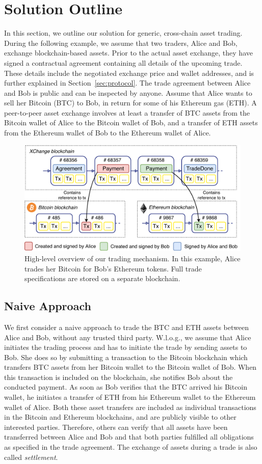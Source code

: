 \section{Solution Outline}
In this section, we outline our solution for generic, cross-chain asset trading.
During the following example, we assume that two traders, Alice and Bob, exchange blockchain-based assets.
Prior to the actual asset exchange, they have signed a contractual agreement containing all details of the upcoming trade.
These details include the negotiated exchange price and wallet addresses, and is further explained in Section~\ref{sec:protocol}.
The trade agreement between Alice and Bob is public and can be inspected by anyone.
Assume that Alice wants to sell her Bitcoin (BTC) to Bob, in return for some of his Ethereum gas (ETH).
A peer-to-peer asset exchange involves at least a transfer of BTC assets from the Bitcoin wallet of Alice to the Bitcoin wallet of Bob, and a transfer of ETH assets from the Ethereum wallet of Bob to the Ethereum wallet of Alice.

\begin{figure}[t]
	\centering
	\includegraphics[width=.7\linewidth]{xchange/assets/xchange}
	\caption{High-level overview of our \ModelName{} trading mechanism. In this example, Alice trades her Bitcoin for Bob's Ethereum tokens. Full trade specifications are stored on a separate blockchain.}
	\label{fig:xchange}
\end{figure}

\subsection{Naive Approach}
We first consider a naive approach to trade the BTC and ETH assets between Alice and Bob, without any trusted third party.
W.l.o.g., we assume that Alice initiates the trading process and has to initiate the trade by sending assets to Bob.
She does so by submitting a transaction to the Bitcoin blockchain which transfers BTC assets from her Bitcoin wallet to the Bitcoin wallet of Bob.
When this transaction is included on the blockchain, she notifies Bob about the conducted payment.
As soon as Bob verifies that the BTC arrived his Bitcoin wallet, he initiates a transfer of ETH from his Ethereum wallet to the Ethereum wallet of Alice.
Both these asset transfers are included as individual transactions in the Bitcoin and Ethereum blockchains, and are publicly visible to other interested parties.
Therefore, others can verify that all assets have been transferred between Alice and Bob and that both parties fulfilled all obligations as specified in the trade agreement.
The exchange of assets during a trade is also called \emph{settlement}.

